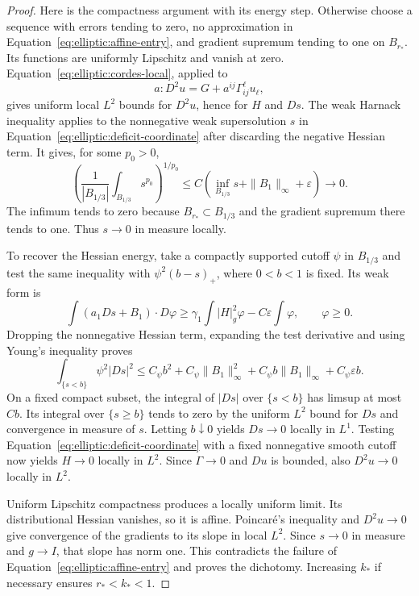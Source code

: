 \begin{proof}
Here is the compactness argument with its energy step.  Otherwise choose
a sequence with errors tending to zero, no approximation in
Equation~\eqref{eq:elliptic:affine-entry}, and gradient supremum tending
to one on $B_{r_*}$.  Its functions are uniformly Lipschitz and vanish
at zero.  Equation~\eqref{eq:elliptic:cordes-local}, applied to
\[
 a:D^2u=G+a^{ij}\Gamma^\ell_{ij}u_\ell,
\]
gives uniform local $L^2$ bounds for $D^2u$, hence for $H$ and $Ds$.
The weak Harnack inequality applies to the nonnegative weak
supersolution $s$ in Equation~\eqref{eq:elliptic:deficit-coordinate}
after discarding the negative Hessian term.  It gives, for some $p_0>0$,
\[
 \left(\frac1{|B_{1/3}|}\int_{B_{1/3}}s^{p_0}\right)^{1/p_0}
   \leq C\left(\inf_{B_{1/3}}s+\|B_1\|_\infty+\varepsilon\right)
   \longrightarrow0.
\]
The infimum tends to zero because $B_{r_*}\subset B_{1/3}$ and the
gradient supremum there tends to one.  Thus $s\to0$ in measure locally.

To recover the Hessian energy, take a compactly supported cutoff $\psi$
in $B_{1/3}$ and test the same inequality with
$\psi^2(b-s)_+$, where $0<b<1$ is fixed.  Its weak form is
\[
 \int(a_1Ds+B_1)\cdot D\varphi
    \geq\gamma_1\int|H|_g^2\varphi-C\varepsilon\int\varphi,
 \qquad\varphi\geq0.
\]
Dropping the nonnegative Hessian term, expanding the test derivative and
using Young's inequality proves
\begin{equation}
 \int_{\{s<b\}}\psi^2|Ds|^2
   \leq C_\psi b^2+C_\psi\|B_1\|_\infty^2
          +C_\psi b\|B_1\|_\infty+C_\psi\varepsilon b.
 \label{eq:elliptic:lower-truncation}
\end{equation}
On a fixed compact subset, the integral of $|Ds|$ over $\{s<b\}$ has
limsup at most $Cb$.  Its integral over $\{s\geq b\}$ tends to zero
by the uniform $L^2$ bound for $Ds$ and convergence in measure of $s$.
Letting $b\downarrow0$ yields $Ds\to0$ locally in $L^1$.
Testing Equation~\eqref{eq:elliptic:deficit-coordinate} with a fixed
nonnegative smooth cutoff now yields $H\to0$ locally in $L^2$.
Since $\Gamma\to0$ and $Du$ is bounded, also $D^2u\to0$ locally in
$L^2$.

Uniform Lipschitz compactness produces a locally uniform limit.  Its
distributional Hessian vanishes, so it is affine.  Poincar\'e's inequality
and $D^2u\to0$ give convergence of the gradients to its slope in local
$L^2$.  Since $s\to0$ in measure and $g\to I$, that slope has norm one.
This contradicts the failure of Equation~\eqref{eq:elliptic:affine-entry}
and proves the dichotomy.  Increasing $k_*$ if necessary ensures
$r_*<k_*<1$.


\end{proof}
